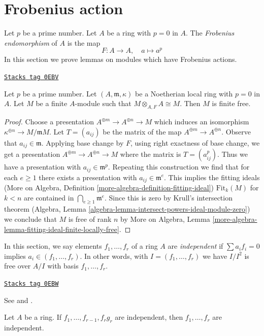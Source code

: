 \section{Frobenius action}
\label{local-cohomology-section-frobenius}
Let $p$ be a prime number. Let $A$ be a ring with $p = 0$ in $A$.
The {\it Frobenius endomorphism} of $A$ is the map
$$
F : A \longrightarrow A,
\quad
a \longmapsto a^p
$$
In this section we prove lemmas on modules which have
Frobenius actions.

\begin{lemma}
\label{local-cohomology-lemma-annihilator-frobenius-module}
\href{https://stacks.math.columbia.edu/tag/0EBV}{\texttt{Stacks tag 0EBV}}

Let $p$ be a prime number. Let $(A, \mathfrak m, \kappa)$
be a Noetherian local ring
with $p = 0$ in $A$. Let $M$ be a finite $A$-module
such that $M \otimes_{A, F} A \cong M$. Then $M$ is finite free.
\end{lemma}

\begin{proof}
Choose a presentation $A^{\oplus m} \to A^{\oplus n} \to M$
which induces an isomorphism $\kappa^{\oplus n} \to M/\mathfrak m M$.
Let $T = (a_{ij})$ be the matrix of the map $A^{\oplus m} \to A^{\oplus n}$.
Observe that $a_{ij} \in \mathfrak m$. Applying base change by
$F$, using right exactness of base change, we get a presentation
$A^{\oplus m} \to A^{\oplus n} \to M$ where the matrix is
$T = (a_{ij}^p)$. Thus we have a presentation with
$a_{ij} \in \mathfrak m^p$. Repeating this construction we
find that for each $e \geq 1$ there exists a presentation with
$a_{ij} \in \mathfrak m^e$. This implies the fitting ideals
(More on Algebra, Definition \ref{more-algebra-definition-fitting-ideal})
$\text{Fit}_k(M)$ for $k < n$ are contained in
$\bigcap_{e \geq 1} \mathfrak m^e$. Since this is zero by
Krull's intersection theorem
(Algebra, Lemma \ref{algebra-lemma-intersect-powers-ideal-module-zero})
we conclude that
$M$ is free of rank $n$ by
More on Algebra, Lemma
\ref{more-algebra-lemma-fitting-ideal-finite-locally-free}.
\end{proof}

In this section, we say elements $f_1, \ldots, f_r$ of a ring $A$
are {\it independent} if $\sum a_if_i = 0$ implies
$a_i \in (f_1, \ldots, f_r)$. In other words, with $I = (f_1, \ldots, f_r)$
we have $I/I^2$ is free over $A/I$ with basis $f_1, \ldots, f_r$.

\begin{lemma}[1]
\label{local-cohomology-lemma-1}
\href{https://stacks.math.columbia.edu/tag/0EBW}{\texttt{Stacks tag 0EBW}}

\begin{reference}
See \cite{Lech-inequalities} and \cite[Lemma 1 page 299]{MatCA}.
\end{reference}
Let $A$ be a ring. If $f_1, \ldots, f_{r - 1}, f_rg_r$
are independent, then $f_1, \ldots, f_r$ are independent.
\end{lemma}

